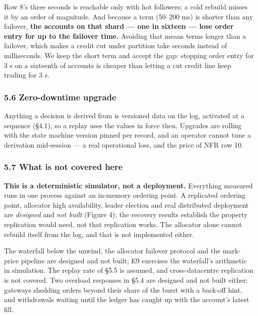 \documentclass[10pt,a4paper]{article}
\begin{document}
Row 8's three seconds is reachable only with hot followers; a cold rebuild
misses it by an order of magnitude. And because a term (50--200 ms) is shorter
than any failover, \textbf{the accounts on that shard --- one in sixteen --- lose order
entry for up to the failover time.} Avoiding that means terms longer than a
failover, which makes a credit cut under partition take seconds instead of
milliseconds. We keep the short term and accept the gap: stopping order entry
for 3 s on a sixteenth of accounts is cheaper than letting a cut credit line keep
trading for 3 s.

\subsubsection{5.6 Zero-downtime upgrade}\label{zero-downtime-upgrade}

Anything a decision is derived from is versioned data on the log, activated at a
sequence (§4.1), so a replay uses the values in force then. Upgrades are rolling
with the state machine version pinned per record, and an operator cannot tune a
derivation mid-session --- a real operational loss, and the price of NFR row 10.

\subsubsection{5.7 What is not covered here}\label{what-is-not-covered-here}

\textbf{This is a deterministic simulator, not a deployment.} Everything measured runs
in one process against an in-memory ordering point. A replicated ordering point,
allocator high availability, leader election and real distributed deployment are
\emph{designed} and \emph{not built} (Figure 4); the recovery results establish the
property replication would need, not that replication works. The allocator alone
cannot rebuild itself from the log, and that is not implemented either.

The waterfall below the unwind, the allocator failover protocol and the
mark-price pipeline are designed and not built; E9 exercises the waterfall's
arithmetic in simulation. The replay rate of §5.5 is assumed, and cross-datacentre
replication is not covered.
Two overload responses in §5.4 are designed and not built either: gateways
shedding orders beyond their share of the burst with a back-off hint, and
withdrawals waiting until the ledger has caught up with the account's latest
fill.
\end{document}
